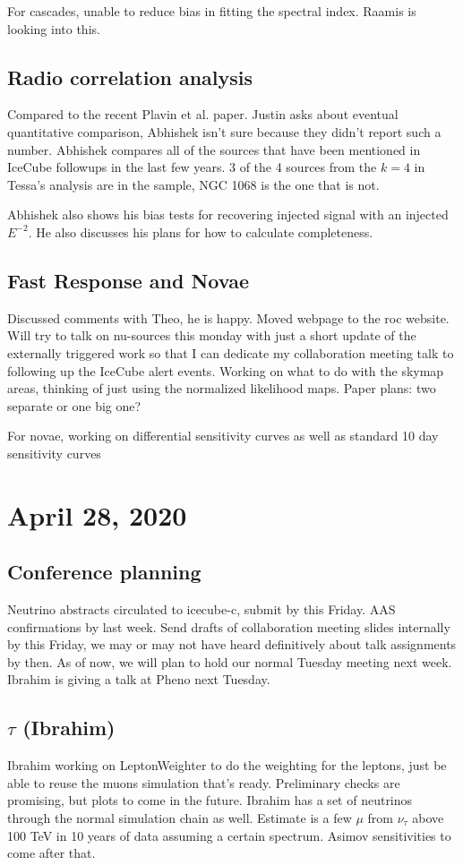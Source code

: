 For cascades, unable to reduce bias in fitting the spectral index. Raamis is looking into this.

\section{Radio correlation analysis}
Compared to the recent Plavin et al. paper. Justin asks about eventual quantitative comparison, Abhishek isn't sure because they didn't report such a number. Abhishek compares all of the sources that have been mentioned in IceCube followups in the last few years. 3 of the 4 sources from the $k=4$ in Tessa's analysis are in the sample, NGC 1068 is the one that is not.

Abhishek also shows his bias tests for recovering injected signal with an injected $E^{-2}$. He also discusses his plans for how to calculate completeness.

\section{Fast Response and Novae}
Discussed comments with Theo, he is happy. Moved webpage to the roc website. Will try to talk on nu-sources this monday with just a short update of the externally triggered work so that I can dedicate my collaboration meeting talk to following up the IceCube alert events. Working on what to do with the skymap areas, thinking of just using the normalized likelihood maps. Paper plans: two separate or one big one?

For novae, working on differential sensitivity curves as well as standard 10 day sensitivity curves

\chapter{April 28, 2020}
\section{Conference planning}
Neutrino abstracts circulated to icecube-c, submit by this Friday. AAS confirmations by last week. Send drafts of collaboration meeting slides internally by this Friday, we may or may not have heard definitively about talk assignments by then. As of now, we will plan to hold our normal Tuesday meeting next week. Ibrahim is giving a talk at Pheno next Tuesday. 

\section{$\tau$ (Ibrahim)}
Ibrahim working on LeptonWeighter to do the weighting for the leptons, just be able to reuse the muons simulation that's ready. Preliminary checks are promising, but plots to come in the future. Ibrahim has a set of neutrinos through the normal simulation chain as well. Estimate is a few $\mu$ from $\nu_{\tau}$ above 100 TeV in 10 years of data assuming a certain spectrum. Asimov sensitivities to come after that. 


